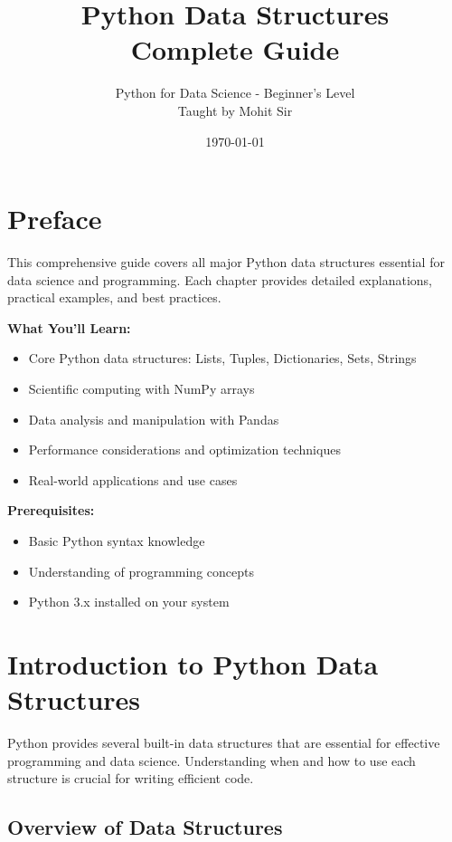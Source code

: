 \documentclass[12pt,a4paper]{book}
\title{\textbf{Python Data Structures\\Complete Guide}}
\author{Python for Data Science - Beginner's Level\\Taught by Mohit Sir}
\date{\today}
\begin{document}
\maketitle

\tableofcontents
\newpage

\chapter*{Preface}

This comprehensive guide covers all major Python data structures essential for data science and programming. Each chapter provides detailed explanations, practical examples, and best practices.

\textbf{What You'll Learn:}
\begin{itemize}
    \item Core Python data structures: Lists, Tuples, Dictionaries, Sets, Strings
    \item Scientific computing with NumPy arrays
    \item Data analysis and manipulation with Pandas
    \item Performance considerations and optimization techniques
    \item Real-world applications and use cases
\end{itemize}

\textbf{Prerequisites:}
\begin{itemize}
    \item Basic Python syntax knowledge
    \item Understanding of programming concepts
    \item Python 3.x installed on your system
\end{itemize}

\chapter{Introduction to Python Data Structures}

Python provides several built-in data structures that are essential for effective programming and data science. Understanding when and how to use each structure is crucial for writing efficient code.

\section{Overview of Data Structures}
\end{document}
